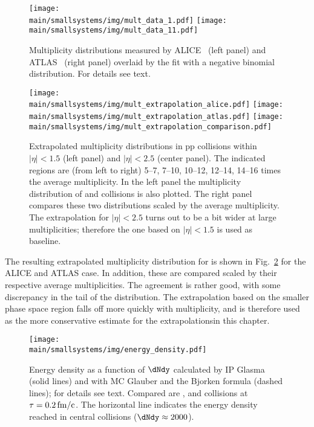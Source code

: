 \documentclass[../report.tex]{subfiles}
\providecommand{\main}{..}
\begin{document}
\begin{figure}[t]
\centering
\texttt{[image: \\main/smallsystems/img/mult\_data\_1.pdf]}
\hfill
\texttt{[image: \\main/smallsystems/img/mult\_data\_11.pdf]}
\caption{Multiplicity distributions measured by ALICE~\cite{Adam:2015gka} (left panel) and ATLAS~\cite{Aad:2010ac,Aad:2016xww} (right panel) overlaid by the fit with a negative binomial distribution. For details see text.}
\label{fig:smallsystems_mult_data}
\end{figure}

\begin{figure}[t]
\centering
\texttt{[image: \\main/smallsystems/img/mult\_extrapolation\_alice.pdf]}
\texttt{[image: \\main/smallsystems/img/mult\_extrapolation\_atlas.pdf]}
\texttt{[image: \\main/smallsystems/img/mult\_extrapolation\_comparison.pdf]}
\caption{Extrapolated multiplicity distributions in pp collisions within $|\eta| < 1.5$ (left panel) and $|\eta| < 2.5$ (center panel). The indicated regions are (from left to right) 5--7, 7--10, 10--12, 12--14, 14--16 times the average multiplicity. In the left panel the multiplicity distribution of \PbPb and \pPb collisions is also plotted. The right panel compares these two distributions scaled by the average multiplicity. The extrapolation for $|\eta| < 2.5$ turns out to be a bit wider at large multiplicities; therefore the one based on $|\eta| < 1.5$ is used as baseline.}
\label{fig:smallsystems_mult_extrapolation}
\end{figure}

The resulting extrapolated multiplicity distribution for \unit[14]{\UTeV} is shown in Fig.~\ref{fig:smallsystems_mult_extrapolation} for the ALICE and ATLAS case. In addition, these are compared scaled by their respective average multiplicities. The agreement is rather good, with some discrepancy in the tail of the distribution. The extrapolation based on the smaller phase space region falls off more quickly with multiplicity, and is therefore used as the more conservative estimate for the extrapolationsin this chapter.

\begin{figure}[t]
\centering
\texttt{[image: \\main/smallsystems/img/energy\_density.pdf]}
\caption{Energy density as a function of $\dNdy$ calculated by IP Glasma (solid lines) and with MC Glauber and the Bjorken formula (dashed lines); for details see text. Compared are \pp, \pPb and \PbPb collisions at $\tau = \unit[0.2]{fm/c}$. The horizontal line indicates the energy density reached in central \PbPb collisions ($\dNdy \approx 2000$).}
\label{fig:energy_density}
\end{figure}
\end{document}
